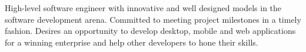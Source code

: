 
\par{
High-level software engineer with innovative and well designed models in the software development arena. Committed to meeting project milestones in a timely fashion. Desires an opportunity to develop desktop, mobile and web applications for a winning enterprise and help other developers to hone their skills.
}

